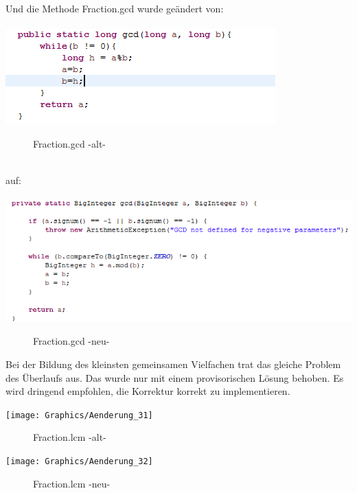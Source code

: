 \documentclass[a4paper, 11pt]{book}
\begin{document}
{Und die Methode Fraction.gcd wurde geändert von:\\
\\
\includegraphics[scale = 1.0]{Graphics/Aenderung_211}
\begin{figure}[h]
	\caption{Fraction.gcd -alt-}
\end{figure}
\\
auf:\\
\\
\includegraphics[scale = 1.0]{Graphics/Aenderung_212}
\begin{figure}[h]
	\caption{Fraction.gcd -neu-}
\end{figure}

Bei der Bildung des kleinsten gemeinsamen Vielfachen trat das gleiche Problem des Überlaufs aus. Das wurde nur mit einem provisorischen Lösung behoben. Es wird dringend empfohlen, die Korrektur korrekt zu implementieren. 

\texttt{[image: Graphics/Aenderung\_31]}
\begin{figure}[h]
	\caption{Fraction.lcm -alt-}
\end{figure}


\texttt{[image: Graphics/Aenderung\_32]}
\begin{figure}[h]
	\caption{Fraction.lcm -neu-}
\end{figure}

}
\end{document}
